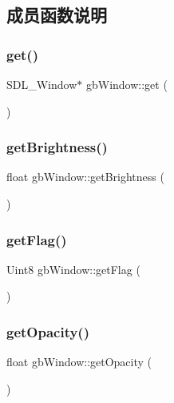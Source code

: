 \subsection{成员函数说明}
\mbox{\label{classgb_window_a3c898bc79a1a4d09fbdf138ccb25fb88}} 
\subsubsection{\texorpdfstring{get()}{get()}}
{\footnotesize\ttfamily S\+D\+L\+\_\+\+Window$\ast$ gb\+Window\+::get (\begin{DoxyParamCaption}{ }\end{DoxyParamCaption})}

\mbox{\label{classgb_window_a285d24584544d223e18078a60882109c}} 
\subsubsection{\texorpdfstring{getBrightness()}{getBrightness()}}
{\footnotesize\ttfamily float gb\+Window\+::get\+Brightness (\begin{DoxyParamCaption}{ }\end{DoxyParamCaption})}

\mbox{\label{classgb_window_a9da9e2d896d38dd055e6224e168294b6}} 
\subsubsection{\texorpdfstring{getFlag()}{getFlag()}}
{\footnotesize\ttfamily Uint8 gb\+Window\+::get\+Flag (\begin{DoxyParamCaption}{ }\end{DoxyParamCaption})}

\mbox{\label{classgb_window_a783ba0e2f72c27f844105909d54b5f5f}} 
\subsubsection{\texorpdfstring{getOpacity()}{getOpacity()}}
{\footnotesize\ttfamily float gb\+Window\+::get\+Opacity (\begin{DoxyParamCaption}{ }\end{DoxyParamCaption})}

